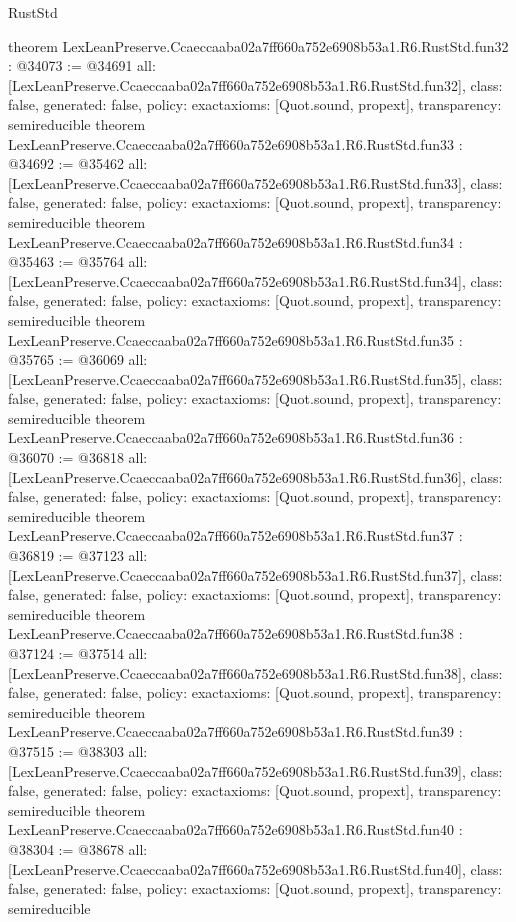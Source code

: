 \begin{lexlean}{RustStd}
\begin{coremodule}
{}
theorem LexLeanPreserve.Ccaeccaaba02a7ff660a752e6908b53a1.R6.RustStd.fun32 : @34073 := @34691 {
  all: [LexLeanPreserve.Ccaeccaaba02a7ff660a752e6908b53a1.R6.RustStd.fun32],
  class: false,
  generated: false,
  policy: exact{axioms: [Quot.sound, propext]},
  transparency: semireducible
}
theorem LexLeanPreserve.Ccaeccaaba02a7ff660a752e6908b53a1.R6.RustStd.fun33 : @34692 := @35462 {
  all: [LexLeanPreserve.Ccaeccaaba02a7ff660a752e6908b53a1.R6.RustStd.fun33],
  class: false,
  generated: false,
  policy: exact{axioms: [Quot.sound, propext]},
  transparency: semireducible
}
theorem LexLeanPreserve.Ccaeccaaba02a7ff660a752e6908b53a1.R6.RustStd.fun34 : @35463 := @35764 {
  all: [LexLeanPreserve.Ccaeccaaba02a7ff660a752e6908b53a1.R6.RustStd.fun34],
  class: false,
  generated: false,
  policy: exact{axioms: [Quot.sound, propext]},
  transparency: semireducible
}
theorem LexLeanPreserve.Ccaeccaaba02a7ff660a752e6908b53a1.R6.RustStd.fun35 : @35765 := @36069 {
  all: [LexLeanPreserve.Ccaeccaaba02a7ff660a752e6908b53a1.R6.RustStd.fun35],
  class: false,
  generated: false,
  policy: exact{axioms: [Quot.sound, propext]},
  transparency: semireducible
}
theorem LexLeanPreserve.Ccaeccaaba02a7ff660a752e6908b53a1.R6.RustStd.fun36 : @36070 := @36818 {
  all: [LexLeanPreserve.Ccaeccaaba02a7ff660a752e6908b53a1.R6.RustStd.fun36],
  class: false,
  generated: false,
  policy: exact{axioms: [Quot.sound, propext]},
  transparency: semireducible
}
theorem LexLeanPreserve.Ccaeccaaba02a7ff660a752e6908b53a1.R6.RustStd.fun37 : @36819 := @37123 {
  all: [LexLeanPreserve.Ccaeccaaba02a7ff660a752e6908b53a1.R6.RustStd.fun37],
  class: false,
  generated: false,
  policy: exact{axioms: [Quot.sound, propext]},
  transparency: semireducible
}
theorem LexLeanPreserve.Ccaeccaaba02a7ff660a752e6908b53a1.R6.RustStd.fun38 : @37124 := @37514 {
  all: [LexLeanPreserve.Ccaeccaaba02a7ff660a752e6908b53a1.R6.RustStd.fun38],
  class: false,
  generated: false,
  policy: exact{axioms: [Quot.sound, propext]},
  transparency: semireducible
}
theorem LexLeanPreserve.Ccaeccaaba02a7ff660a752e6908b53a1.R6.RustStd.fun39 : @37515 := @38303 {
  all: [LexLeanPreserve.Ccaeccaaba02a7ff660a752e6908b53a1.R6.RustStd.fun39],
  class: false,
  generated: false,
  policy: exact{axioms: [Quot.sound, propext]},
  transparency: semireducible
}
theorem LexLeanPreserve.Ccaeccaaba02a7ff660a752e6908b53a1.R6.RustStd.fun40 : @38304 := @38678 {
  all: [LexLeanPreserve.Ccaeccaaba02a7ff660a752e6908b53a1.R6.RustStd.fun40],
  class: false,
  generated: false,
  policy: exact{axioms: [Quot.sound, propext]},
  transparency: semireducible
}
\end{coremodule}
\end{lexlean}
